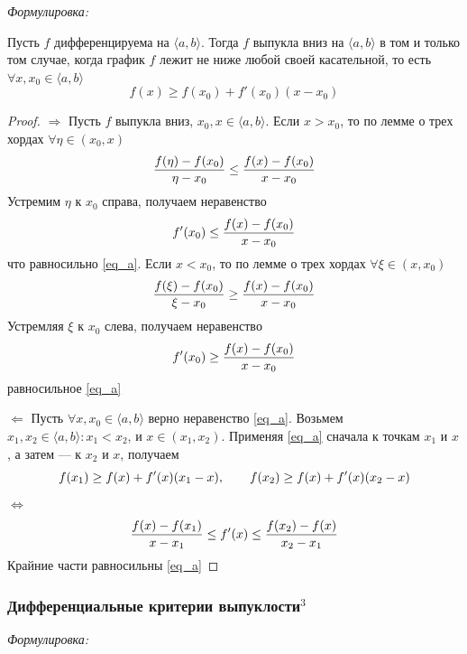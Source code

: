 \documentclass{article}
\begin{document}
\textit{Формулировка:}

Пусть $f$ дифференцируема на $\langle a, b\rangle$. Тогда $f$ выпукла вниз на $\langle a, b\rangle$ в том и только том случае, когда график $f$ лежит не ниже любой своей касательной, то есть $\forall x, x_0 \in \langle a, b\rangle$
\begin{equation}\label{eq_a}
f(x) \geq f(x_0) + f'(x_0)(x-x_0)
\end{equation}

\begin{proof}
\item{$\Rightarrow$}
Пусть $f$ выпукла вниз, $x_0, x \in \langle a, b\rangle$.
Если $x > x_0$, то по лемме о трех хордах $\forall \eta \in (x_0, x)$
\begin{equation}
\frac{f(\eta) - f(x_0)} {\eta - x_0} \leq \frac{f(x) - f(x_0)} {x - x_0} \notag
\end{equation}
Устремим $\eta$ к $x_0$ справа, получаем неравенство
\begin{equation}
f'(x_0) \leq \frac{f(x) - f(x_0)} {x -x_0} \notag
\end{equation}
что равносильно \eqref{eq_a}.
Если $x < x_0$, то по лемме о трех хордах $\forall \xi \in (x, x_0)$
\begin{equation}
\frac{f(\xi) - f(x_0)} {\xi - x_0} \geq \frac{f(x) - f(x_0)} {x - x_0}\notag
\end{equation}
Устремляя $\xi$ к $x_0$ слева, получаем неравенство
\begin{equation}
f'(x_0) \geq \frac{f(x) - f(x_0)} {x - x_0}\notag
\end{equation}
равносильное \eqref{eq_a}
\item{$\Leftarrow$}
Пусть $\forall x, x_0 \in \langle a, b\rangle$ верно неравенство \eqref{eq_a}. Возьмем $x_1, x_2 \in \langle a, b\rangle: x_1 < x_2$, и $x \in (x_1, x_2)$. Применяя \eqref{eq_a} сначала к точкам $x_1$ и $x$, а затем --- к $x_2$ и $x$, получаем
\begin{equation}
f(x_1) \geq f(x) + f'(x)(x_1 - x), \qquad f(x_2) \geq f(x) + f'(x)(x_2 - x)\notag
\end{equation}
$\Leftrightarrow$
\begin{equation}
\frac{f(x) - f(x_1)} {x - x_1} \leq f'(x) \leq \frac{f(x_2) - f(x)} {x_2 - x_1}\notag
\end{equation}
Крайние части равносильны \eqref{eq_a}
\end{proof}

\subsubsection{Дифференциальные критерии выпуклости\texorpdfstring{$^3$}{}}
\textit{Формулировка: }
\end{document}

